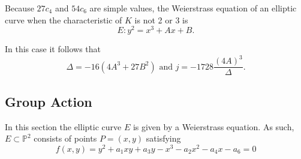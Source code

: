 Because $27c_4$ and $54c_6$ are simple values, the Weierstrass equation of an elliptic curve when the characteristic of $K$ is not 2 or 3 is
\begin{equation*}
E:y^2=x^3+Ax+B.
\end{equation*}

In this case it follows that
\begin{equation*}
\Delta=-16(4A^3+27B^2)\text{ and }j=-1728\frac{(4A)^3}{\Delta}.
\end{equation*}

\subsection{Group Action}
In this section the elliptic curve $E$ is given by a Weierstrass equation. As such, $E\subset\mathbb{P}^2$ consists of points $P=(x,y)$ satisfying
\begin{equation*}
f(x,y)=y^2+a_1xy+a_3y-x^3-a_2x^2-a_4x-a_6=0
\end{equation*}

